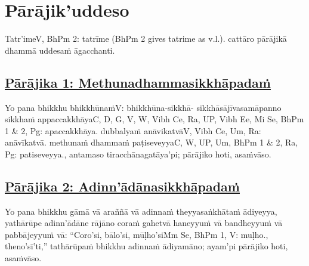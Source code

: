
\section{Pārājik'uddeso}
\label{par}

\begin{intro}
	Tatr'ime\makeatletter\hyperlink{endnote-appendix}\makeatother V, BhPm 2: tatrīme (BhPm 2 gives tatrime as v.l.). cattāro pārājikā dhammā uddesaṁ āgacchanti.
\end{intro}

\setsubsecheadstyle{\subsubsectionFmt}
\subsection*{\hyperref[disq1]{Pārājika 1: Methunadhammasikkhāpadaṁ}}
\label{par1}

Yo pana bhikkhu bhikkhūnaṁ\makeatletter\hyperlink{endnote-appendix}\makeatother V: bhikkhūna-sikkhā- sikkhāsājīvasamāpanno sikkhaṁ appaccakkhāya\makeatletter\hyperlink{endnote-appendix}\makeatother C, D, G, V, W, Vibh Ce, Ra, UP, Vibh Ee, Mi Se, BhPm 1 & 2, Pg: apaccakkhāya. dubbalyaṁ anāvikatvā\makeatletter\hyperlink{endnote-appendix}\makeatother V, Vibh Ce, Um, Ra: anāvīkatvā. methunaṁ dhammaṁ paṭiseveyya\makeatletter\hyperlink{endnote-appendix}\makeatother C, W, UP, Um, BhPm 1 & 2, Ra, Pg: patiseveyya., antamaso tiracchānagatāya'pi; pārājiko hoti, asaṁvāso.



\subsection*{\hyperref[disq2]{Pārājika 2: Adinn'ādānasikkhāpadaṁ}}
\label{par2}

Yo pana bhikkhu gāmā vā araññā vā adinnaṁ theyyasaṅkhātaṁ ādiyeyya, yathārūpe adinn'ādāne rājāno coraṁ gahetvā haneyyuṁ vā bandheyyuṁ vā pabbājeyyuṁ vā: ``Coro'si, bālo'si, mūḷho'si\makeatletter\hyperlink{endnote-appendix}\makeatother Mm Se, BhPm 1, V: muḷho., theno'sī'ti,'' tathārūpaṁ bhikkhu adinnaṁ ādiyamāno; ayam'pi pārājiko hoti, asaṁvāso.



